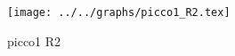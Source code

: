 \begin{figure}[h] \centering\texttt{[image: ../../graphs/picco1\_R2.tex]}\caption{picco1 R2}\label{gr:picco1_R2} \end{figure}
